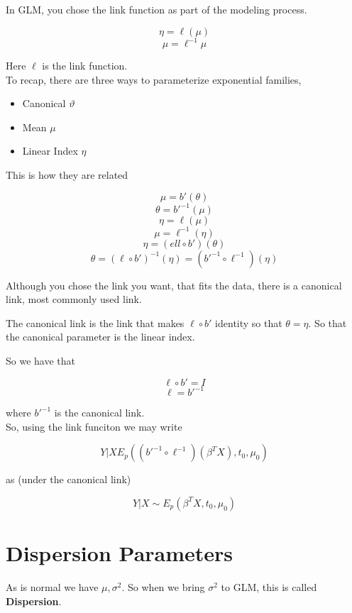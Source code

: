 \documentclass[11pt,fleqn]{book} %
\begin{document}
In GLM, you chose the link function as part of the modeling process.

		$$\eta = \ell(\mu)$$
		$$\mu = \ell^{-1}\mu$$

Here $\ell$ is the link function. \\

To recap, there are three ways to parameterize exponential families, 

		\begin{itemize}
			\item Canonical $\vartheta$
			\item Mean $\mu$
			\item Linear Index $\eta$
		\end{itemize}

This is how they are related

		$$\mu = b'(\theta) $$
		$$\theta = b'^{-1}(\mu) $$
		$$\eta = \ell(\mu)$$
		$$\mu = \ell^{-1}(\eta) $$
		$$\eta = (ell \circ b')(\theta) $$
		$$\theta = (\ell \circ b')^{-1} (\eta) = (b'^{-1} \circ \ell^{-1}) (\eta)$$
		

Although you chose the link you want, that fits the data, there is a canonical link, most commonly used link. 

\begin{definition}
	The canonical link is the link that makes $\ell \circ b'$ identity so that $\theta = \eta$. So that the canonical parameter is the linear index.
\end{definition}

So we have that

		$$\ell \circ b' = I $$
		$$\ell = b'^{-1}$$

where $b'^{-1}$ is the canonical link.\\

So, using the link funciton we may write

		$$Y|X E_p \left( (b'^{-1} \circ \ell^{-1})(\beta^T X), t_0, \mu_0 \right) $$

as (under the canonical link)

		$$Y|X \sim E_p (\beta^T X, t_0, \mu_0) $$


\section{Dispersion Parameters}

As is normal we have $\mu, \sigma^2$. So when we bring $\sigma^2$ to GLM, this is called \textbf{Dispersion}. \\
\end{document}
